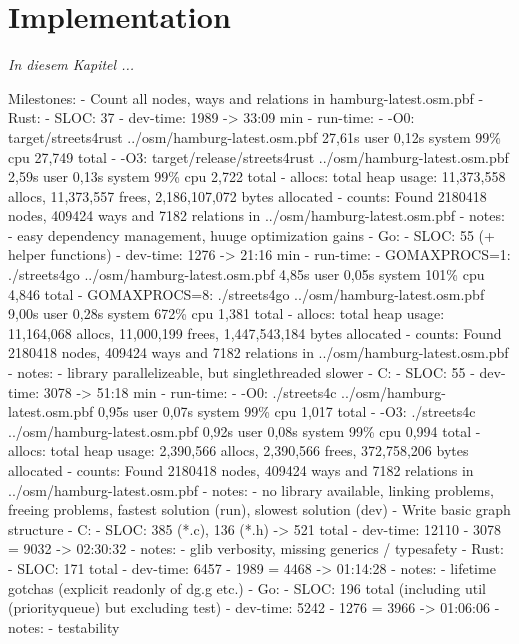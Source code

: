 \chapter{Implementation}
\label{chap:Implementation}

\textit{%
In diesem Kapitel ...
}
\bigskip


Milestones:
    - Count all nodes, ways and relations in hamburg-latest.osm.pbf
        - Rust:
            - SLOC: 37
            - dev-time: 1989 -> 33:09 min
            - run-time:
                - -O0: target/streets4rust ../osm/hamburg-latest.osm.pbf  27,61s user 0,12s system 99\% cpu 27,749 total
                - -O3: target/release/streets4rust ../osm/hamburg-latest.osm.pbf  2,59s user 0,13s system 99\% cpu 2,722 total
            - allocs: total heap usage: 11,373,558 allocs, 11,373,557 frees, 2,186,107,072 bytes allocated
            - counts: Found 2180418 nodes, 409424 ways and 7182 relations in ../osm/hamburg-latest.osm.pbf
            - notes:
                - easy dependency management, huuge optimization gains
        - Go:
            - SLOC: 55 (+ helper functions)
            - dev-time: 1276 -> 21:16 min
            - run-time:
                - GOMAXPROCS=1: ./streets4go ../osm/hamburg-latest.osm.pbf  4,85s user 0,05s system 101\% cpu 4,846 total
                - GOMAXPROCS=8: ./streets4go ../osm/hamburg-latest.osm.pbf  9,00s user 0,28s system 672\% cpu 1,381 total
            - allocs: total heap usage: 11,164,068 allocs, 11,000,199 frees, 1,447,543,184 bytes allocated
            - counts: Found 2180418 nodes, 409424 ways and 7182 relations in ../osm/hamburg-latest.osm.pbf
            - notes:
                - library parallelizeable, but singlethreaded slower
        - C:
            - SLOC: 55
            - dev-time: 3078 -> 51:18 min
            - run-time:
                - -O0: ./streets4c ../osm/hamburg-latest.osm.pbf  0,95s user 0,07s system 99\% cpu 1,017 total
                - -O3: ./streets4c ../osm/hamburg-latest.osm.pbf  0,92s user 0,08s system 99\% cpu 0,994 total
            - allocs: total heap usage: 2,390,566 allocs, 2,390,566 frees, 372,758,206 bytes allocated
            - counts: Found 2180418 nodes, 409424 ways and 7182 relations in ../osm/hamburg-latest.osm.pbf
            - notes:
                - no library available, linking problems, freeing problems, fastest solution (run), slowest solution (dev)
    - Write basic graph structure
        - C:
            - SLOC: 385 (*.c), 136 (*.h) -> 521 total
            - dev-time: 12110 - 3078 = 9032 -> 02:30:32
            - notes:
                - glib verbosity, missing generics / typesafety
        - Rust:
            - SLOC: 171 total
            - dev-time: 6457 - 1989 = 4468 -> 01:14:28
            - notes:
                - lifetime gotchas (explicit readonly of dg.g etc.)
        - Go:
            - SLOC: 196 total (including util (priorityqueue) but excluding test)
            - dev-time: 5242 - 1276 = 3966 -> 01:06:06
            - notes:
                - testability
